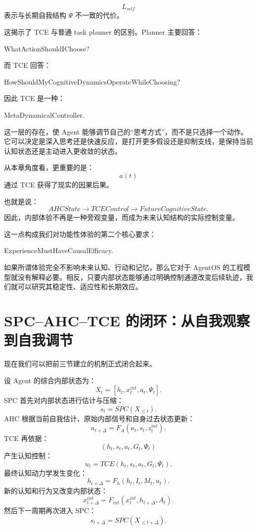 \[
L_{self}
\]
表示与长期自我结构 $\Psi$ 不一致的代价。

这揭示了 TCE 与普通 task planner 的区别。Planner 主要回答：
\begin{statementbox}
WhatActionShouldIChoose?
\end{statementbox}
而 TCE 回答：
\begin{statementbox}
HowShouldMyCognitiveDynamicsOperateWhileChoosing?
\end{statementbox}

因此 TCE 是一种：
\begin{statementbox}
MetaDynamicalController.
\end{statementbox}

这一层的存在，使 Agent 能够调节自己的``思考方式''，而不是只选择一个动作。它可以决定是深入思考还是快速反应，是打开更多假设还是抑制支线，是保持当前认知状态还是主动进入更收敛的状态。

从本章角度看，更重要的是：
\[
a(t)
\]
通过 TCE 获得了现实的因果后果。

也就是说：
\[
AHCState
\rightarrow
TCEControl
\rightarrow
FutureCognitiveState.
\]
因此，内部体验不再是一种旁观变量，而成为未来认知结构的实际控制变量。

这一点构成我们对功能性体验的第二个核心要求：
\begin{statementbox}
ExperienceMustHaveCausalEfficacy.
\end{statementbox}
如果所谓体验完全不影响未来认知、行动和记忆，那么它对于 AgentOS 的工程模型就没有解释必要。相反，只要内部状态能够通过明确控制通道改变后续轨迹，我们就可以研究其稳定性、适应性和长期效应。

\section{SPC--AHC--TCE 的闭环：从自我观察到自我调节}

现在我们可以把前三节建立的机制正式闭合起来。

设 Agent 的综合内部状态为：
\[
X_t
=
\left[
h_t,
x_t^{int},
a_t,
\Psi_t
\right].
\]
SPC 首先对内部状态进行估计与压缩：
\[
s_t
=
SPC(X_{\leq t}).
\]
AHC 根据当前自我估计、原始内部信号和自身过去状态更新：
\[
a_{t+\Delta}
=
F_A
\left(
a_t,
s_t,
z_t^{int}
\right).
\]
TCE 再依据：
\[
(h_t,s_t,a_t,G_t,\Psi_t)
\]
产生认知控制：
\[
u_t
=
TCE
\left(
h_t,s_t,a_t,G_t,\Psi_t
\right).
\]
最终认知动力学发生变化：
\[
h_{t+\Delta}
=
F_h
\left(
h_t,
I_t,
M_t,
u_t
\right).
\]
新的认知和行为又改变内部状态：
\[
x_{t+\Delta}^{int}
=
F_{int}
\left(
x_t^{int},
h_{t+\Delta},
A_t
\right).
\]
然后下一周期再次进入 SPC：
\[
s_{t+\Delta}
=
SPC(X_{\leq t+\Delta}).
\]

